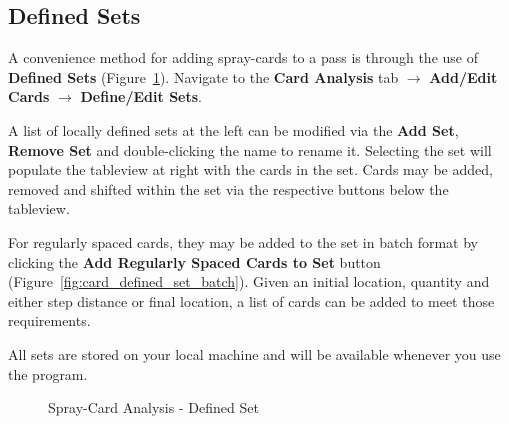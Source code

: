 \documentclass[10pt,letterpaper,titlepage]{article}
\begin{document}
    \subsection{Defined Sets}
    \label{sec:defined_sets}
    A convenience method for adding spray-cards to a pass is through the use of \textbf{Defined Sets} (Figure~\ref{fig:card_defined_set}). Navigate to the \textbf{Card Analysis} tab $\rightarrow$ \textbf{Add/Edit Cards} $\rightarrow$ \textbf{Define/Edit Sets}.\par
    A list of locally defined sets at the left can be modified via the \textbf{Add Set}, \textbf{Remove Set} and double-clicking the name to rename it. Selecting the set will populate the tableview at right with the cards in the set. Cards may be added, removed and shifted within the set via the respective buttons below the tableview.\par
    For regularly spaced cards, they may be added to the set in batch format by clicking the \textbf{Add Regularly Spaced Cards to Set} button (Figure~\ref{fig:card_defined_set_batch}). Given an initial location, quantity and either step distance or final location, a list of cards can be added to meet those requirements.\par
    All sets are stored on your local machine and will be available whenever you use the program.
    \begin{figure}[hb]
        \centering
        \caption{Spray-Card Analysis - Defined Set}
        \label{fig:card_defined_set}
    \end{figure}
\end{document}
